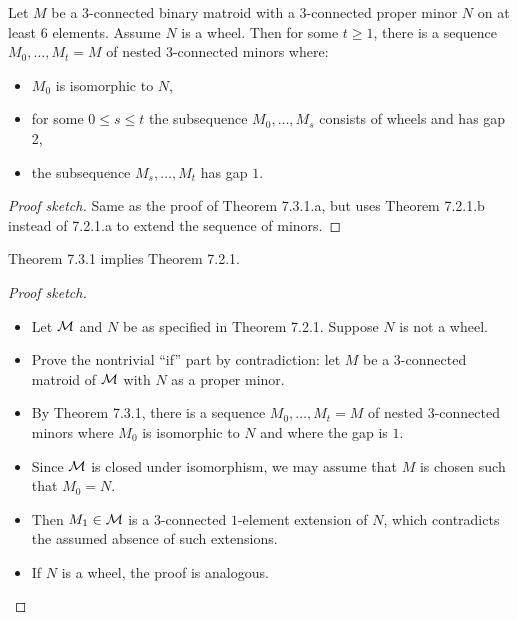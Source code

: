 \begin{theorem}[7.3.1.b]
  \label{thm:7.3.1.b}
  \uses{}
  Let $M$ be a $3$-connected binary matroid with a $3$-connected proper minor $N$ on at least $6$ elements. Assume $N$ is a wheel.
  Then for some $t \geq 1$, there is a sequence $M_{0}, \dots, M_{t} = M$ of nested $3$-connected minors where:
  \begin{itemize}
    \item $M_{0}$ is isomorphic to $N$,
    \item for some $0 \leq s \leq t$ the subsequence $M_{0}, \dots, M_{s}$ consists of wheels and has gap 2,
    \item the subsequence $M_{s}, \dots, M_{t}$ has gap $1$.
  \end{itemize}
\end{theorem}

\begin{proof}[Proof sketch]
  Same as the proof of Theorem 7.3.1.a, but uses Theorem 7.2.1.b instead of 7.2.1.a to extend the sequence of minors.
\end{proof}

\begin{proposition}[7.2.1 from 7.3.1]
  \label{prop:7.2.1_from_7.3.1}
  Theorem 7.3.1 implies Theorem 7.2.1.
\end{proposition}

\begin{proof}[Proof sketch]
  \begin{itemize}
    \item Let $\mathcal{M}$ and $N$ be as specified in Theorem 7.2.1. Suppose $N$ is not a wheel.
    \item Prove the nontrivial ``if'' part by contradiction: let $M$ be a $3$-connected matroid of $\mathcal{M}$ with $N$ as a proper minor.
    \item By Theorem 7.3.1, there is a sequence $M_{0}, \dots, M_{t} = M$ of nested $3$-connected minors where $M_{0}$ is isomorphic to $N$ and where the gap is $1$.
    \item Since $\mathcal{M}$ is closed under isomorphism, we may assume that $M$ is chosen such that $M_{0} = N$.
    \item Then $M_{1} \in \mathcal{M}$ is a $3$-connected $1$-element extension of $N$, which contradicts the assumed absence of such extensions.
    \item If $N$ is a wheel, the proof is analogous.
  \end{itemize}
\end{proof}

